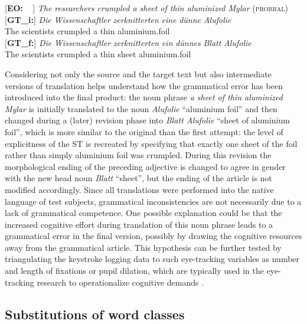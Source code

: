 \documentclass[output=paper]{LSP/langsci}
\begin{document}
\ea \label{ex:1:7}
\begin{xlist}
\exi{}[\textbf{EO:~~}]{ \emph{The researchers crumpled a sheet of thin aluminized Mylar} (\textsc{probral})}
\exi{}[\textbf{GT\_i:}]{
\gll \emph{Die} \emph{Wissenschaftler} \emph{zerknitterten} \emph{eine} \emph{dünne} \emph{Alufolie}\\
 The scientists crumpled a thin aluminium.foil\\
}
\exi{}[\textbf{GT\_f:}]{
\gll \emph{Die} \emph{Wissenschaftler} \emph{zerknitterten} \emph{ein} \emph{dünnes} \emph{Blatt} \emph{Alufolie}\\
The scientists crumpled a thin sheet aluminium.foil\\
}
\end{xlist}
\z

Considering not only the source and the target text but also intermediate versions of translation helps understand how the grammatical error has been introduced into the final product: the noun phrase \textit{a sheet of thin aluminized Mylar} is initially translated to the noun \textit{Alufolie} “aluminium foil” and then changed during a (later) revision phase into \textit{Blatt Alufolie} “sheet of aluminium foil”, which is more similar to the original than the first attempt: the level of explicitness of the ST is recreated by specifying that exactly one sheet of the foil rather than simply aluminium foil was crumpled. During this revision the morphological ending of the preceding adjective is changed to agree in gender with the new head noun \textit{Blatt} “sheet”, but the ending of the article is not modified accordingly. Since all translations were performed into the native language of test subjects, grammatical inconsistencies are not necessarily due to a lack of grammatical competence. One possible explanation could be that the increased cognitive effort during translation of this noun phrase leads to a grammatical error in the final version, possibly by drawing the cognitive resources away from the grammatical article. This hypothesis can be further tested by triangulating the keystroke logging data to such eye-tracking variables as number and length of fixations or pupil dilation, which are typically used in the eye-tracking research to operationalize cognitive demands \citep[e.g.][]{Pavlovic2009}.

\subsection{Substitutions of word classes}
\end{document}

